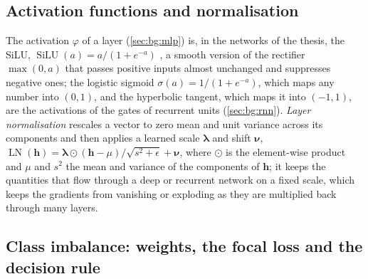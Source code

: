 \subsection{Activation functions and normalisation}
\label{sec:bg:activations}

The activation $\varphi$ of a layer (\cref{sec:bg:mlp}) is, in the networks of the thesis, the SiLU, $\operatorname{SiLU}(a) = a /
(1 + e^{-a})$ \cite{elfwing2018silu,hendrycks2016gelu}, a smooth version of the rectifier
$\max(0, a)$ that passes positive inputs almost unchanged and suppresses negative ones;
the logistic sigmoid $\sigma(a) = 1 / (1 + e^{-a})$, which maps any number into $(0, 1)$,
and the hyperbolic tangent, which maps it into $(-1, 1)$, are the activations of the gates
of recurrent units (\cref{sec:bg:rnn}).  \emph{Layer normalisation} \cite{ba2016layernorm}
rescales a vector to zero mean and unit variance across its components and then applies a
learned scale $\boldsymbol{\lambda}$ and shift $\boldsymbol{\nu}$, $\operatorname{LN}(\mathbf{h}) =
\boldsymbol{\lambda} \odot (\mathbf{h} - \mu) / \sqrt{s^2 + \epsilon} + \boldsymbol{\nu}$,
where $\odot$ is the element-wise product and $\mu$ and $s^2$ the
mean and variance of the components of $\mathbf{h}$; it keeps the quantities that flow
through a deep or recurrent network on a fixed scale, which keeps the gradients
from vanishing or exploding as they are multiplied back through many layers.

\subsection{Class imbalance: weights, the focal loss and the decision rule}
\label{sec:bg:learning:imbalance}

